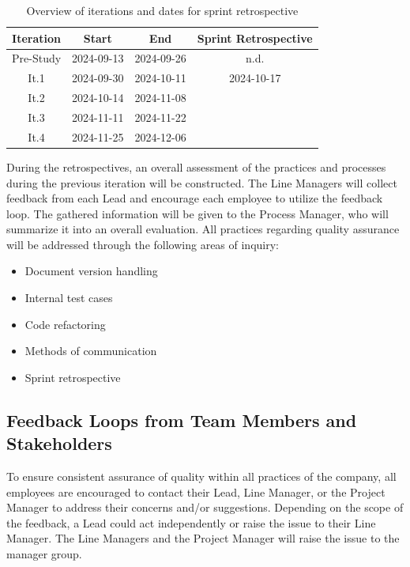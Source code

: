\documentclass{article}
\begin{document}
\begin{table}[H]
    \centering
    \caption{Overview of iterations and dates for sprint retrospective}
    \begin{tabular}{|c|c|c|c|}
    \hline
        \textbf{Iteration} & \textbf{Start} & \textbf{End} & \textbf{Sprint Retrospective}\\\hline
        Pre-Study & 2024-09-13 & 2024-09-26 & n.d. \\\hline
        It.1 & 2024-09-30 & 2024-10-11 & 2024-10-17 \\\hline
        It.2 & 2024-10-14 & 2024-11-08 & \\\hline
        It.3 & 2024-11-11 & 2024-11-22 & \\\hline
        It.4 & 2024-11-25 & 2024-12-06 & \\\hline
    \end{tabular}
    \label{tab:iteration_table}
\end{table}

During the retrospectives, an overall assessment of the practices and processes during the previous iteration will be constructed. The Line Managers will collect feedback from each Lead and encourage each employee to utilize the feedback loop. The gathered information will be given to the Process Manager, who will summarize it into an overall evaluation. All practices regarding quality assurance will be addressed through the following areas of inquiry:

\begin{itemize}
    \item Document version handling
    \item Internal test cases
    \item Code refactoring
    \item Methods of communication
    \item Sprint retrospective
\end{itemize}


\subsection{Feedback Loops from Team Members and Stakeholders}
To ensure consistent assurance of quality within all practices of the company, all employees are encouraged to contact their Lead, Line Manager, or the Project Manager to address their concerns and/or suggestions. Depending on the scope of the feedback, a Lead could act independently or raise the issue to their Line Manager. The Line Managers and the Project Manager will raise the issue to the manager group.
\end{document}
